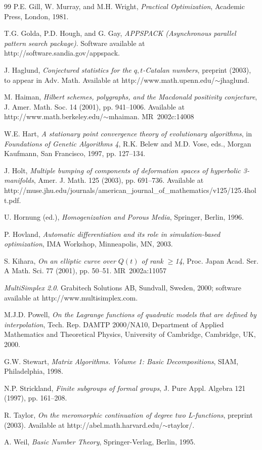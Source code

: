 \documentclass[]{interact}
\theoremstyle{plain}%
\theoremstyle{definition}
\theoremstyle{remark}
\begin{document}
\begin{thebibliography}{99}
P.E. Gill, W. Murray, and M.H. Wright, \emph{Practical Optimization}, Academic
  Press, London, 1981.

T.G. Golda, P.D. Hough, and G. Gay, \emph{APPSPACK (Asynchronous parallel
  pattern search package)}. Software available at 
  http://software.sandia.gov/appspack.

J. Haglund, \emph{Conjectured statistics for the {$q,t$}-Catalan numbers},
  preprint (2003), to appear in Adv. Math. Available at 
  http://www.math.upenn.edu/$\sim$jhaglund.

M. Haiman, \emph{Hilbert schemes, polygraphs, and the Macdonald positivity
  conjecture}, J. Amer. Math. Soc. 14 (2001), pp. 941--1006. Available at
  http://www.math.berkeley.edu/$\sim$mhaiman. MR~2002c:14008

W.E. Hart, \emph{A stationary point convergence theory of evolutionary
  algorithms}, in \emph{Foundations of Genetic Algorithms 4}, R.K. Belew and
  M.D. Vose, eds., Morgan Kaufmann, San Francisco, 1997, pp. 127--134.

J. Holt, \emph{Multiple bumping of components of deformation spaces of
  hyperbolic 3-manifolds}, Amer. J. Math. 125 (2003), pp. 691--736. Available at
  http://muse.jhu.edu/journals/american\_journal\_of\_mathematics/v125/125.4holt.pdf.

U. Hornung (ed.), \emph{Homogenization and Porous Media}, Springer, Berlin,
  1996.

P. Hovland, \emph{Automatic differentiation and its role in simulation-based
  optimization}, IMA Workshop, Minneapolis, MN, 2003.

S. Kihara, \emph{On an elliptic curve over {$Q(t)$} of rank $\geq$14}, Proc.
  Japan Acad. Ser. A Math. Sci. 77 (2001), pp. 50--51. MR~2002a:11057

\emph{MultiSimplex 2.0}. Grabitech Solutions AB, Sundvall, Sweden, 2000;
  software available at http://www.multisimplex.com.

M.J.D. Powell, \emph{On the Lagrange functions of quadratic models that are
  defined by interpolation}, Tech. Rep. DAMTP 2000/NA10, Department of
  Applied Mathematics and Theoretical Physics, University of Cambridge,
  Cambridge, UK, 2000.

G.W. Stewart, \emph{Matrix Algorithms. Volume 1: Basic Decompositions}, SIAM,
  Philadelphia, 1998.

N.P. Strickland, \emph{Finite subgroups of formal groups}, J. Pure Appl.
  Algebra 121 (1997), pp. 161--208.

R. Taylor, \emph{On the meromorphic continuation of degree two L-functions},
  preprint (2003). Available at http://abel.math.harvard.edu/$\sim$rtaylor/.

A. Weil, \emph{Basic Number Theory}, Springer-Verlag, Berlin, 1995.

\end{thebibliography}
\end{document}
